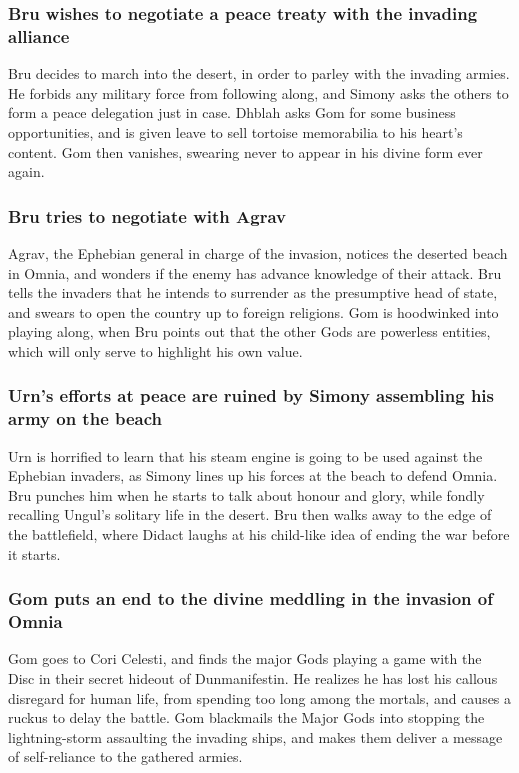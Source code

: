 \subsubsection{\Gls{Bru} wishes to negotiate a peace treaty with the invading alliance}
\Gls{Bru} decides to march into the desert, in order to parley with the invading armies. He forbids
any military force from following along, and \Gls{Simony} asks the others to form a peace delegation
just in case. \Gls{Dhblah} asks \Gls{Gom} for some business opportunities, and is given leave to
sell tortoise memorabilia to his heart's content. \Gls{Gom} then vanishes, swearing never to appear
in his divine form ever again.

\subsubsection{\Gls{Bru} tries to negotiate with \Gls{Agrav}}
\Gls{Agrav}, the Ephebian general in charge of the invasion, notices the deserted beach in Omnia,
and wonders if the enemy has advance knowledge of their attack. \Gls{Bru} tells the invaders that
he intends to surrender as the presumptive head of state, and swears to open the country up to
foreign religions. \Gls{Gom} is hoodwinked into playing along, when \Gls{Bru} points out that the
other Gods are powerless entities, which will only serve to highlight his own value.

\subsubsection{\Gls{Urn}'s efforts at peace are ruined by \Gls{Simony} assembling his army on the
    beach}
\Gls{Urn} is horrified to learn that his steam engine is going to be used against the Ephebian
invaders, as \Gls{Simony} lines up his forces at the beach to defend Omnia. \Gls{Bru} punches him
when he starts to talk about honour and glory, while fondly recalling \Gls{Ungul}'s solitary life
in the desert. \Gls{Bru} then walks away to the edge of the battlefield, where \Gls{Didact} laughs
at his child-like idea of ending the war before it starts.

\subsubsection{\Gls{Gom} puts an end to the divine meddling in the invasion of Omnia}
\Gls{Gom} goes to Cori Celesti, and finds the major Gods playing a game with the Disc in their
secret hideout of Dunmanifestin. He realizes he has lost his callous disregard for human life, from
spending too long among the mortals, and causes a ruckus to delay the battle. \Gls{Gom} blackmails
the Major Gods into stopping the lightning-storm assaulting the invading ships, and makes them
deliver a message of self-reliance to the gathered armies.

